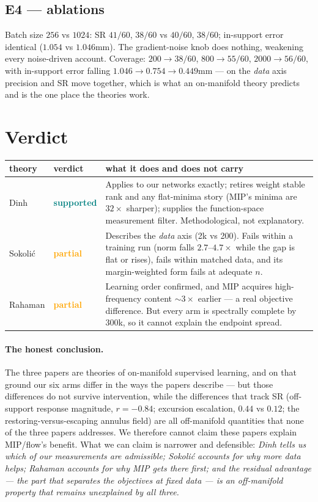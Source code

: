 \documentclass[10pt]{article}
\newcommand{\yes}{\textcolor{teal}{\textbf{supported}}}
\newcommand{\partialv}{\textcolor{orange}{\textbf{partial}}}
\begin{document}
\subsection*{E4 --- ablations}
Batch size $256$ vs $1024$: SR $41/60$, $38/60$ vs $40/60$, $38/60$; in-support
error identical ($1.054$ vs $1.046$mm). The gradient-noise knob does
nothing, weakening every noise-driven account. Coverage: $200 \to 38/60$,
$800 \to 55/60$, $2000 \to 56/60$, with in-support error falling
$1.046 \to 0.754 \to 0.449$mm --- on the \emph{data} axis precision and SR
move together, which is what an on-manifold theory predicts and is the
one place the theories work.

\section{Verdict}

\begin{center}\small
\begin{tabular}{llp{7.4cm}}
\toprule
theory & verdict & what it does and does not carry \\
\midrule
Dinh & \yes{} & Applies to our networks exactly; retires weight stable
rank and any flat-minima story (MIP's minima are $32\times$ sharper);
supplies the function-space measurement filter. Methodological, not
explanatory. \\
Sokoli\'c & \partialv{} & Describes the \emph{data} axis (2k vs 200).
Fails within a training run (norm falls $2.7$--$4.7\times$ while the gap
is flat or rises), fails within matched data, and its margin-weighted
form fails at adequate $n$. \\
Rahaman & \partialv{} & Learning order confirmed, and MIP acquires
high-frequency content $\sim3\times$ earlier --- a real objective
difference. But every arm is spectrally complete by 300k, so it cannot
explain the endpoint spread. \\
\bottomrule
\end{tabular}
\end{center}

\paragraph{The honest conclusion.} The three papers are theories of
on-manifold supervised learning, and on that ground our six arms differ
in the ways the papers describe --- but those differences do not survive
intervention, while the differences that track SR (off-support response
magnitude, $r=-0.84$; excursion escalation, $0.44$ vs $0.12$; the
restoring-versus-escaping annulus field) are all off-manifold quantities
that none of the three papers addresses. We therefore cannot claim these
papers explain MIP/flow's benefit. What we can claim is narrower and
defensible: \emph{Dinh tells us which of our measurements are admissible;
Sokoli\'c accounts for why more data helps; Rahaman accounts for why MIP
gets there first; and the residual advantage --- the part that separates
the objectives at fixed data --- is an off-manifold property that remains
unexplained by all three.}
\end{document}
